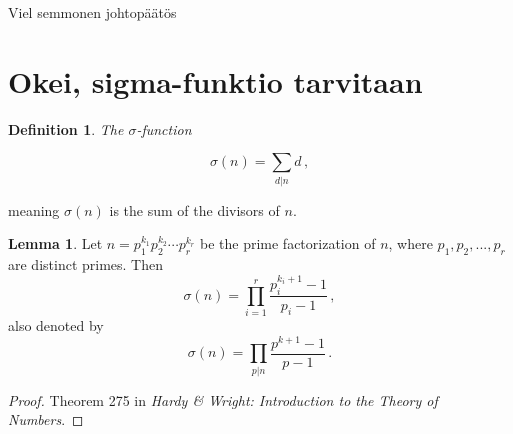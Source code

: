 \documentclass{article}
\theoremstyle{definition}
\newtheorem{definition}[subsection]{Definition}
\newtheorem{lemma}[subsubsection]{Lemma}
\begin{document}
Viel semmonen johtopäätös

\section{Okei, sigma-funktio tarvitaan}

\begin{definition}{\emph{The $\sigma$-function}}

\begin{equation*}
    \sigma(n)=\sum_{d\vert n} d\,,
\end{equation*}

meaning $\sigma(n)$ is the sum of the divisors of $n$.
\end{definition}

\begin{lemma}
\label{lemma:sigma}
Let $n=p_1^{k_1}p_2^{k_2}\cdots p_r^{k_r}$ be the prime factorization of $n$, where $p_1,p_2,...,p_r$ are distinct primes. Then
\begin{equation*}
    \sigma(n)=\prod_{i=1}^r \frac{p_i^{k_i+1}-1}{p_i-1}\,,
\end{equation*}
also denoted by
\begin{equation*}
    \sigma(n) = \prod_{p\vert n} \frac{p^{k+1}-1}{p-1}\,.
\end{equation*}

\begin{proof}
Theorem 275 in \textit{Hardy \& Wright: Introduction to the Theory of Numbers}.
\end{proof}
\end{lemma}
\end{document}
